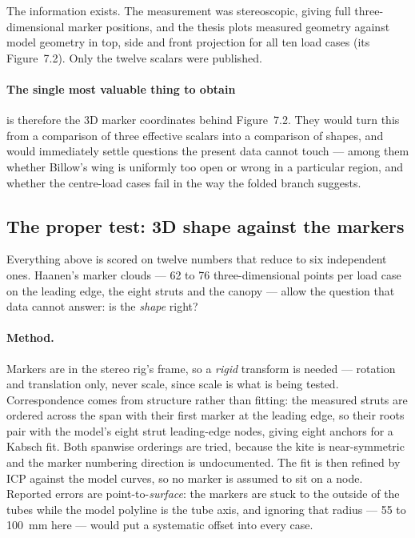 \documentclass[11pt,a4paper]{article}
\begin{document}
The information exists. The measurement was stereoscopic, giving full
three-dimensional marker positions, and the thesis plots measured geometry
against model geometry in top, side and front projection for all ten load cases
(its Figure~7.2). Only the twelve scalars were published.

\paragraph{The single most valuable thing to obtain} is therefore the 3D marker
coordinates behind Figure~7.2. They would turn this from a comparison of three
effective scalars into a comparison of shapes, and would immediately settle
questions the present data cannot touch --- among them whether Billow's wing is
uniformly too open or wrong in a particular region, and whether the centre-load
cases fail in the way the folded branch suggests.

\subsection{The proper test: 3D shape against the markers}
\label{sec:hang-shape}

Everything above is scored on twelve numbers that reduce to six independent
ones. Haanen's marker clouds --- 62 to 76 three-dimensional points per load case
on the leading edge, the eight struts and the canopy --- allow the question that
data cannot answer: is the \emph{shape} right?

\paragraph{Method.} Markers are in the stereo rig's frame, so a \emph{rigid}
transform is needed --- rotation and translation only, never scale, since scale
is what is being tested. Correspondence comes from structure rather than
fitting: the measured struts are ordered across the span with their first marker
at the leading edge, so their roots pair with the model's eight strut
leading-edge nodes, giving eight anchors for a Kabsch fit. Both spanwise
orderings are tried, because the kite is near-symmetric and the marker numbering
direction is undocumented. The fit is then refined by ICP against the model
curves, so no marker is assumed to sit on a node. Reported errors are
point-to-\emph{surface}: the markers are stuck to the outside of the tubes while
the model polyline is the tube axis, and ignoring that radius --- 55 to
\SI{100}{mm} here --- would put a systematic offset into every case.
\end{document}
